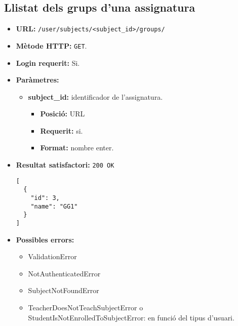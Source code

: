 \subsection{Llistat dels grups d'una assignatura}
\begin{itemize}
\item \textbf{\ac{URL}:} \texttt{/user/subjects/<subject\_id>/groups/}
\item \textbf{Mètode \ac{HTTP}: } \texttt{GET}.
\item \textbf{Login requerit:} Si.
\item \textbf{Paràmetres:}
	\begin{itemize}
		\item \textbf{subject\_id:} identificador de l'assignatura.
		\begin{itemize}
			\item \textbf{Posició:} \ac{URL}
			\item \textbf{Requerit:} si.
			\item \textbf{Format:} nombre enter.
		\end{itemize}
	\end{itemize}

\item \textbf{Resultat satisfactori:} \texttt{200 OK}
	\begin{verbatim}
[
  {
    "id": 3,
    "name": "GG1"
  }
]
	\end{verbatim}
	
	
\item \textbf{Possibles errors:}
	\begin{itemize}
		\item ValidationError
		\item NotAuthenticatedError
		\item SubjectNotFoundError
		\item TeacherDoesNotTeachSubjectError o StudentIsNotEnrolledToSubjectError: en funció del tipus d'usuari.
	\end{itemize}
\end{itemize}

